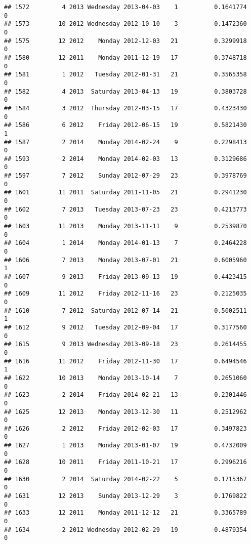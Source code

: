 \documentclass[
]{article}
\begin{document}
\begin{verbatim}
## 1572         4 2013 Wednesday 2013-04-03    1          0.1641774             0
## 1573        10 2012 Wednesday 2012-10-10    3          0.1472360             0
## 1575        12 2012    Monday 2012-12-03   21          0.3299918             0
## 1580        12 2011    Monday 2011-12-19   17          0.3748718             0
## 1581         1 2012   Tuesday 2012-01-31   21          0.3565358             0
## 1582         4 2013  Saturday 2013-04-13   19          0.3803728             0
## 1584         3 2012  Thursday 2012-03-15   17          0.4323430             0
## 1586         6 2012    Friday 2012-06-15   19          0.5821430             1
## 1587         2 2014    Monday 2014-02-24    9          0.2298413             0
## 1593         2 2014    Monday 2014-02-03   13          0.3129686             0
## 1597         7 2012    Sunday 2012-07-29   23          0.3978769             0
## 1601        11 2011  Saturday 2011-11-05   21          0.2941230             0
## 1602         7 2013   Tuesday 2013-07-23   23          0.4213773             0
## 1603        11 2013    Monday 2013-11-11    9          0.2539870             0
## 1604         1 2014    Monday 2014-01-13    7          0.2464228             0
## 1606         7 2013    Monday 2013-07-01   21          0.6005960             1
## 1607         9 2013    Friday 2013-09-13   19          0.4423415             0
## 1609        11 2012    Friday 2012-11-16   23          0.2125035             0
## 1610         7 2012  Saturday 2012-07-14   21          0.5002511             1
## 1612         9 2012   Tuesday 2012-09-04   17          0.3177560             0
## 1615         9 2013 Wednesday 2013-09-18   23          0.2614455             0
## 1616        11 2012    Friday 2012-11-30   17          0.6494546             1
## 1622        10 2013    Monday 2013-10-14    7          0.2651060             0
## 1623         2 2014    Friday 2014-02-21   13          0.2301446             0
## 1625        12 2013    Monday 2013-12-30   11          0.2512962             0
## 1626         2 2012    Friday 2012-02-03   17          0.3497823             0
## 1627         1 2013    Monday 2013-01-07   19          0.4732009             0
## 1628        10 2011    Friday 2011-10-21   17          0.2996216             0
## 1630         2 2014  Saturday 2014-02-22    5          0.1715367             0
## 1631        12 2013    Sunday 2013-12-29    3          0.1769822             0
## 1633        12 2011    Monday 2011-12-12   21          0.3365789             0
## 1634         2 2012 Wednesday 2012-02-29   19          0.4879354             0

\end{verbatim}
\end{document}
